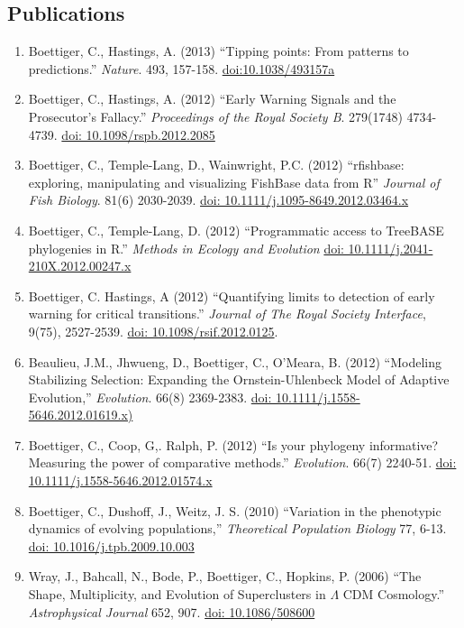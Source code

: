 \documentclass[margin]{res}
\begin{document}
\begin{resume}
\section{Publications}
\begin{enumerate}
  \item Boettiger, C., Hastings, A. (2013) ``Tipping points: From patterns to predictions.'' {\it Nature}. 493, 157-158. \href{http://dx.doi.org/10.1038/493157a}{doi:10.1038/493157a} 
  \item Boettiger, C., Hastings, A. (2012) ``Early Warning Signals and the Prosecutor's Fallacy.'' {\it Proceedings of the Royal Society B}. 279(1748) 4734-4739.   \href{http://dx.doi.org/10.1098/rspb.2012.2085}{doi: 10.1098/rspb.2012.2085} 
  \item Boettiger, C., Temple-Lang, D., Wainwright, P.C. (2012) ``rfishbase: exploring, manipulating and visualizing FishBase data from R'' {\it Journal of Fish Biology}. 81(6) 2030-2039. \href{http://dx.doi.org/10.1111/j.1095-8649.2012.03464.x}{doi: 10.1111/j.1095-8649.2012.03464.x} 
  \item Boettiger, C., Temple-Lang, D. (2012)  ``Programmatic access to TreeBASE phylogenies in R.'' {\it Methods in Ecology and Evolution}  \href{http://dx.doi.org/10.1111/j.2041-210X.2012.00247.x}{doi: 10.1111/j.2041-210X.2012.00247.x} 
  \item Boettiger, C. Hastings, A (2012) ``Quantifying limits to detection of early warning for critical transitions.'' {\it Journal of The Royal Society Interface},  9(75), 2527-2539. \href{http://dx.doi.org/10.1098/rsif.2012.0125}{doi: 10.1098/rsif.2012.0125}. 
  \item Beaulieu, J.M., Jhwueng, D., Boettiger, C., O'Meara, B. (2012) ``Modeling Stabilizing Selection: Expanding the Ornstein-Uhlenbeck Model of Adaptive Evolution,'' {\it Evolution}. 66(8) 2369-2383. \href{http://dx.doi.org/10.1111/j.1558-5646.2012.01619.x}{doi: 10.1111/j.1558-5646.2012.01619.x)} 
  \item Boettiger, C., Coop, G,. Ralph, P. (2012) ``Is your phylogeny informative? Measuring the power of comparative methods.'' {\it Evolution}. 66(7) 2240-51. \href{http://dx.doi.org/10.1111/j.1558-5646.2012.01574.x}{doi: 10.1111/j.1558-5646.2012.01574.x} 
  \item Boettiger, C., Dushoff, J., Weitz, J. S. (2010) ``Variation in the phenotypic dynamics of evolving populations,'' {\it Theoretical Population Biology} 77, 6-13. \href{http://dx.doi.org/10.1016/j.tpb.2009.10.003}{doi: 10.1016/j.tpb.2009.10.003} 
  \item Wray, J., Bahcall, N., Bode, P., Boettiger, C., Hopkins, P.  (2006)  ``The Shape, Multiplicity, and Evolution of Superclusters in $\Lambda$ CDM Cosmology.''  {\it Astrophysical Journal} 652, 907. \href{http://dx.doi.org/10.1086/508600}{doi: 10.1086/508600} 
\end{enumerate}

\end{resume}
\end{document}

